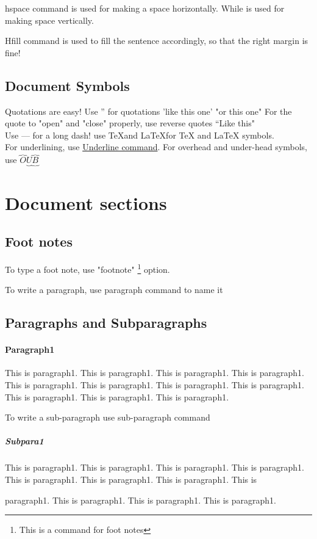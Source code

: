 \documentclass[10pt,a4paper]{article}
\begin{document}
\hspace{5cm} hspace command is used for making a space horizontally. While \vspace{2cm} is used for making space vertically. 

\hfill Hfill command is used to fill the sentence accordingly, so that the right margin is fine!

\subsection{Document Symbols}
Quotations are easy! Use '' for quotations 'like this one' "or this one" For the quote to "open" and "close" properly, use reverse quotes ``Like this"\\

Use --- for a long dash! use \TeX and \LaTeX for TeX and LaTeX symbols.\\

For underlining, use \underline{Underline command}. For overhead and under-head symbols, use $\overbrace{O}  \underbrace{U}  \overbrace{\underbrace{B}} $

\section{Document sections}

\subsection{Foot notes}

To type a foot note, use "footnote" \footnote{This is a command for foot notes} option.

To write a paragraph, use paragraph command to name it

\subsection{Paragraphs and Subparagraphs}

\paragraph{Paragraph1}
This is paragraph1. This is paragraph1. This is paragraph1. This is paragraph1. This is paragraph1. This is paragraph1. This is paragraph1. This is paragraph1. This is paragraph1. This is paragraph1. This is paragraph1. 

To write a sub-paragraph use sub-paragraph command
\subparagraph{Subpara1}
This is paragraph1. This is paragraph1. This is paragraph1. This is paragraph1. This is paragraph1. This is paragraph1. This is paragraph1. This is \par paragraph1. This is paragraph1. This is paragraph1. This is paragraph1.
\end{document}
